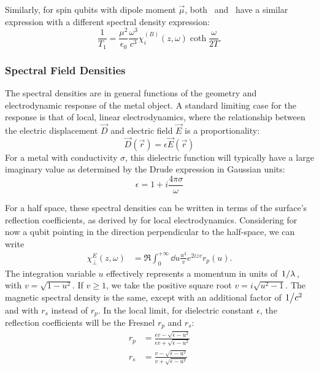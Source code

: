 \documentclass[%
 preprint,
 amsmath,amssymb,
 aps,
]{revtex4-2}
\begin{document}
Similarly, for spin qubits with dipole moment $\vec{\mu}$, both~\cite{QubitRelax} and~\cite{Henkel1999} have a similar expression with a different spectral density expression:
\begin{equation}
	\frac{1}{T_1} = \frac{\mu^2}{\epsilon_0} \frac{\omega^3}{c^3} \chi_{i}^{(B)}(z, \omega) \coth\frac{\omega}{2 T}.
\end{equation}

\subsubsection{Spectral Field Densities} \label{subsec:spectraldensities}
The spectral densities are in general functions of the geometry and electrodynamic response of the metal object.
A standard limiting case for the response is that of local, linear electrodynamics, where the relationship between the electric displacement $\vec{D}$ and electric field $\vec{E}$ is a proportionality:
\begin{equation}
	\vec{D}(\vec{r}) = \epsilon \vec{E}(\vec{r})
\end{equation}
For a metal with conductivity $\sigma$, this dielectric function will typically have a large imaginary value as determined by the Drude expression in Gaussian units:
\begin{equation}
	\epsilon = 1 + i\frac{4 \pi \sigma}{\omega}
\end{equation}

For a half space, these spectral densities can be written in terms of the surface's reflection coefficients, as derived by\cite{Henkel1999} for local electrodynamics.
Considering for now a qubit pointing in the direction perpendicular to the half-space, we can write
\begin{align}
	\chi_\perp^E(z, \omega) &= \Re \int_0^{+\infty} \dd{u} \frac{u^3}{v} e^{2 i z v} r_p(u). \label{eq:chi}
\end{align}
The integration variable $u$ effectively represents a momentum in units of $\flatfrac{1}{\lambda}$, with $v = \sqrt{1 - u^2}$.
If $v \geq 1$, we take the positive square root $v = i \sqrt{u^2 - 1}$.
The magnetic spectral density is the same, except with an additional factor of $\flatfrac{1}{c^2}$ and with $r_s$ instead of $r_p$.
In the local limit, for dielectric constant $\epsilon$, the reflection coefficients will be the Fresnel $r_p$ and $r_s$:
\begin{align}
	r_p &= \frac{\epsilon v - \sqrt{\epsilon - u^2}}{\epsilon v + \sqrt{\epsilon - u^2}} \\
	r_s &= \frac{v - \sqrt{\epsilon - u^2}}{ v + \sqrt{\epsilon - u^2}}
\end{align}
\end{document}
